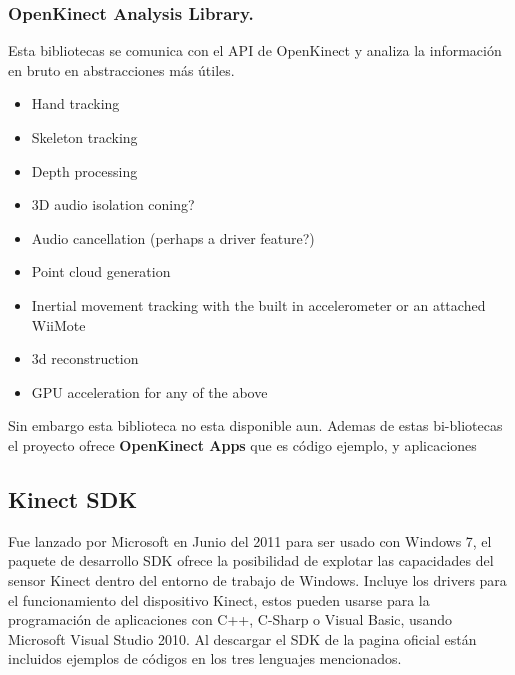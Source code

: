 \documentclass[11pt,a4paper]{article}
\begin{document}
\subsubsection{OpenKinect Analysis Library.}
Esta bibliotecas se comunica con el API de OpenKinect y analiza la información en bruto en abstracciones más útiles.
\begin{itemize}
\item Hand tracking
\item Skeleton tracking
\item Depth processing
\item 3D audio isolation coning?
\item Audio cancellation (perhaps a driver feature?)
\item Point cloud generation
\item Inertial movement tracking with the built in accelerometer or an attached WiiMote
\item 3d reconstruction
\item GPU acceleration for any of the above 
\end{itemize}
Sin embargo esta biblioteca no esta disponible aun. Ademas de estas bi-bliotecas el proyecto ofrece \textbf{OpenKinect Apps} que es  código ejemplo, y aplicaciones 

\subsection{Kinect SDK}
Fue lanzado por Microsoft en Junio del 2011 para ser usado con Windows 7, el paquete de desarrollo SDK ofrece la posibilidad de explotar las capacidades del sensor Kinect dentro del entorno de trabajo de Windows. Incluye los drivers para el funcionamiento del dispositivo Kinect, estos pueden usarse para la programación de aplicaciones con C++, C-Sharp o Visual Basic, usando Microsoft Visual Studio 2010. Al descargar el SDK de la pagina oficial están incluidos ejemplos de códigos en los tres lenguajes mencionados.
\end{document}

